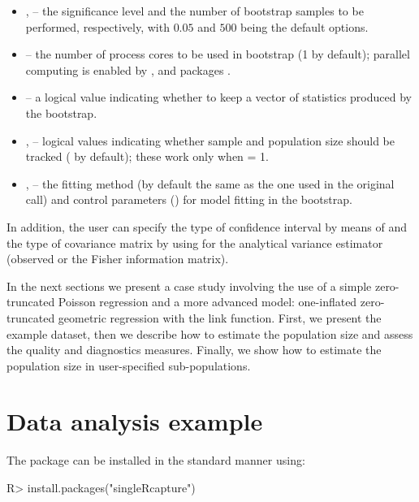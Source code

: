 \documentclass[
]{jss}
\newcommand{\1}{\mathcal{I}} \newcommand{\bZero}{\boldsymbol{0}}
\begin{document}
\begin{itemize}
  \item {},  -- the significance level and the number of bootstrap samples to be performed, respectively, with $0.05$ and $500$ being the default options.
  \item {} -- the number of process cores to be used in bootstrap (1 by default); parallel computing is enabled by  \citep{doParallel},  \citep{foreach} and  packages \citep{parallel}.
  \item {} -- a logical value indicating whether to keep a vector of statistics produced by the bootstrap.
  \item {},  --  logical values indicating whether sample and population size should be tracked ( by default); these work only when  = 1.
    \item {},  -- the fitting method (by default the same as the one used in the original call) and control parameters () for model fitting in the bootstrap.
\end{itemize}

In addition, the user can specify the type of confidence interval by
means of  and the type of covariance matrix by using
 for the analytical variance estimator (observed or the
Fisher information matrix).

In the next sections we present a case study involving the use of a
simple zero-truncated Poisson regression and a more advanced model:
one-inflated zero-truncated geometric regression with the 
link function. First, we present the example dataset, then we describe
how to estimate the population size and assess the quality and
diagnostics measures. Finally, we show how to estimate the population
size in user-specified sub-populations.

\section{Data analysis example}\label{sec-study}

The package can be installed in the standard manner using:

\begin{CodeChunk}
\begin{CodeInput}
R> install.packages("singleRcapture")
\end{CodeInput}
\end{CodeChunk}
\end{document}
